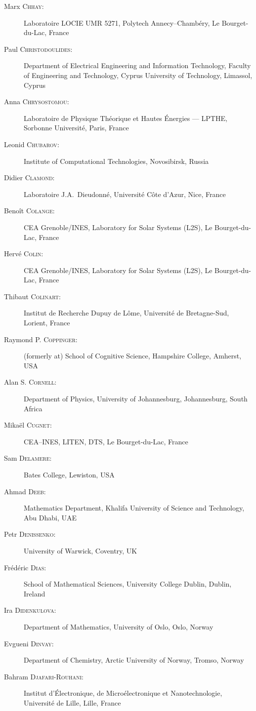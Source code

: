\begin{description}
  \item[Marx \textsc{Chhay}:] Laboratoire LOCIE UMR 5271, Polytech Annecy--Chamb\'ery, Le Bourget-du-Lac, France
  \item[Paul \textsc{Christodoulides}:] Department of Electrical Engineering and Information Technology, Faculty of Engineering and Technology, Cyprus University of Technology, Limassol, Cyprus
  \item[Anna \textsc{Chrysostomou}:] Laboratoire de Physique Th\'eorique et Hautes \'Energies --- LPTHE, Sorbonne Universit\'e, Paris, France
  \item[Leonid \textsc{Chubarov}:] Institute of Computational Technologies, Novosibirsk, Russia
  \item[Didier \textsc{Clamond}:] Laboratoire J.A.~Dieudonn\'e, Universit\'e C\^ote d'Azur, Nice, France
  \item[Beno\^it \textsc{Colange}:] CEA Grenoble/INES, Laboratory for Solar Systems (L2S), Le Bourget-du-Lac, France
  \item[Herv\'e \textsc{Colin}:] CEA Grenoble/INES, Laboratory for Solar Systems (L2S), Le Bourget-du-Lac, France
  \item[Thibaut \textsc{Colinart}:] Institut de Recherche Dupuy de L\^ome, Universit\'e de Bretagne-Sud, Lorient, France
  \item[Raymond P. \textsc{Coppinger}:] (formerly at) School of Cognitive Science, Hampshire College, Amherst, USA
  \item[Alan S. \textsc{Cornell}:] Department of Physics, University of Johannesburg, Johannesburg, South Africa
  \item[Mika\"el \textsc{Cugnet}:] CEA--INES, LITEN, DTS, Le Bourget-du-Lac, France
  \item[Sam \textsc{Delamere}:] Bates College, Lewiston, USA
  \item[Ahmad \textsc{Deeb}:] Mathematics Department, Khalifa University of Science and Technology, Abu Dhabi, UAE
  \item[Petr \textsc{Denissenko}:] University of Warwick, Coventry, UK
  \item[Fr\'ed\'eric \textsc{Dias}:] School of Mathematical Sciences, University College Dublin, Dublin, Ireland
  \item[Ira \textsc{Didenkulova}:] Department of Mathematics, University of Oslo, Oslo, Norway
  \item[Evgueni \textsc{Dinvay}:] Department of Chemistry, Arctic University of Norway, Tromso, Norway
  \item[Bahram \textsc{Djafari-Rouhani}:] Institut d'\'Electronique, de Micro\'electronique et Nanotechnologie, Universit\'e de Lille, Lille, France

\end{description}
